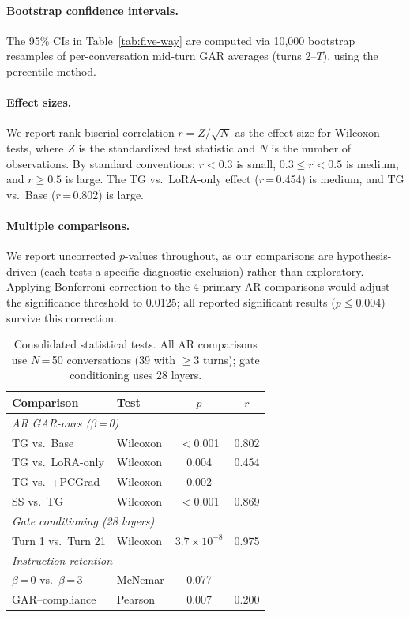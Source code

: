 \paragraph{Bootstrap confidence intervals.} The 95\% CIs in Table~\ref{tab:five-way} are computed via 10,000 bootstrap resamples of per-conversation mid-turn GAR averages (turns 2--$T$), using the percentile method.

\paragraph{Effect sizes.} We report rank-biserial correlation $r = Z / \sqrt{N}$ as the effect size for Wilcoxon tests, where $Z$ is the standardized test statistic and $N$ is the number of observations. By standard conventions: $r < 0.3$ is small, $0.3 \leq r < 0.5$ is medium, and $r \geq 0.5$ is large. The TG vs.\ LoRA-only effect ($r$\,=\,0.454) is medium, and TG vs.\ Base ($r$\,=\,0.802) is large.

\paragraph{Multiple comparisons.} We report uncorrected $p$-values throughout, as our comparisons are hypothesis-driven (each tests a specific diagnostic exclusion) rather than exploratory. Applying Bonferroni correction to the 4 primary AR comparisons would adjust the significance threshold to 0.0125; all reported significant results ($p \leq 0.004$) survive this correction.

\begin{table}[t]
\centering\small
\caption{Consolidated statistical tests. All AR comparisons use $N$\,=\,50 conversations (39 with $\geq$3 turns); gate conditioning uses 28 layers.}
\label{tab:stat-tests}
\begin{tabular}{llcc}
\toprule
\textbf{Comparison} & \textbf{Test} & $p$ & $r$ \\
\midrule
\multicolumn{4}{l}{\emph{AR GAR-ours ($\beta$\,=\,0)}} \\
TG vs.\ Base & Wilcoxon & $<$0.001 & 0.802 \\
TG vs.\ LoRA-only & Wilcoxon & 0.004 & 0.454 \\
TG vs.\ +PCGrad & Wilcoxon & 0.002 & --- \\
SS vs.\ TG & Wilcoxon & $<$0.001 & 0.869 \\
\midrule
\multicolumn{4}{l}{\emph{Gate conditioning (28 layers)}} \\
Turn 1 vs.\ Turn 21 & Wilcoxon & $3.7\!\times\!10^{-8}$ & 0.975 \\
\midrule
\multicolumn{4}{l}{\emph{Instruction retention}} \\
$\beta$\,=\,0 vs.\ $\beta$\,=\,3 & McNemar & 0.077 & --- \\
GAR--compliance & Pearson & 0.007 & 0.200 \\
\bottomrule
\end{tabular}
\end{table}

